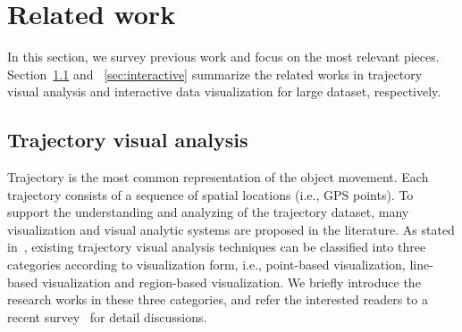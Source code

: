 \section{Related work}\label{sec:rel}
In this section, we survey previous work and focus on the most relevant pieces.
Section~\ref{sec:trajvisana} and ~\ref{sec:interactive} summarize the related works in trajectory visual analysis and interactive data visualization for large dataset, respectively.

\subsection{Trajectory visual analysis}\label{sec:trajvisana}
Trajectory is the most common representation of the object movement.
Each trajectory consists of a sequence of spatial locations (i.e., GPS points).
To support the understanding and analyzing of the trajectory dataset,
many visualization and visual analytic systems are proposed in the literature.
As stated in~\cite{chen2015survey}, existing trajectory visual analysis techniques can be classified into three categories according to visualization form,
i.e., point-based visualization, line-based visualization and region-based visualization.
We briefly introduce the research works in these three categories, and refer the interested readers to a recent survey~\cite{chen2015survey} for detail discussions.

